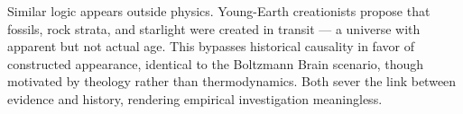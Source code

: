 \begin{historical}
Similar logic appears outside physics. Young-Earth creationists propose that fossils, rock strata, and starlight were created in transit — a universe with apparent but not actual age. This bypasses historical causality in favor of constructed appearance, identical to the Boltzmann Brain scenario, though motivated by theology rather than thermodynamics. Both sever the link between evidence and history, rendering empirical investigation meaningless.
\end{historical}
